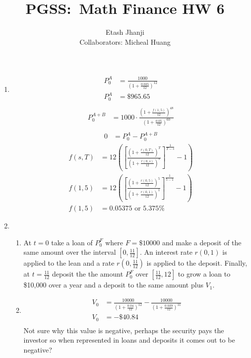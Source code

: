 \documentclass[11pt,letterpaper]{article}
\author{Etash Jhanji\\\small Collaborators: Micheal Huang}
\title{PGSS:\ Math Finance HW 6}
\date{}
\begin{document}
\maketitle
\begin{enumerate}
    \item\begin{align*}
            P_0^A &= \frac{1000}{\left(1+\frac{0.035}{12}\right)^{12}}\\
            P_0^A &= \$ 965.65\\
        \end{align*}
        \begin{align*}
            P_0^{A\!+\!B} &= 1000\cdot\frac{\left(1+\frac{f(1,5)}{12}\right)^{48}}{\left(1+\frac{0.05}{12}\right)^{60}}\\
        \end{align*}
        \begin{align*}
            0 &= P_0^A - P_0^{A\!+\!B}
        \end{align*}
        \begin{align*}
            f(s,T) &= 12{\left( \left[ \frac{(1+ \frac{r(0,T)}{12})^T}{(1+ \frac{r(0,s)}{12})^s} \right]^{\frac{1}{T-s}}-1 \right)}\\
            f(1,5) &= 12{\left( \left[ \frac{(1+ \frac{r(0,5)}{12})^5}{(1+ \frac{r(0,1)}{12})^1} \right]^{\frac{1}{5-1}}-1 \right)}\\
            f(1,5) &= 0.05375 \text{ or } 5.375\%
        \end{align*}
    \item \begin{enumerate}
        \item At $t=0$ take a loan of $P_0^F$ where $F = \$10000$ and make a deposit of the same amount over the interval $\left[0,\frac{11}{12}\right]$. An interest rate $r(0,1)$ is applied to the lean and a rate $r(0,\frac{11}{12})$ is applied to the deposit. Finally, at $t=\frac{11}{12}$ deposit the the amount $P_0^F$ over $\left[\frac{11}{12}, 12\right]$ to grow a loan to \$10,000 over a year and a deposit to the same amount plus $V_1$. 
        \item \begin{align*}
            V_0 &= \frac{10000}{\left(1+\frac{0.04}{12}\right)^{12}} - \frac{10000}{\left(1+\frac{0.039}{12}\right)^{11}}\\
            V_0 &= - \$ 40.84\\
        \end{align*}
        Not sure why this value is negative, perhaps the security pays the investor so when represented in loans and deposits it comes out to be negative? 
    \end{enumerate}
\end{enumerate}
\end{document}
